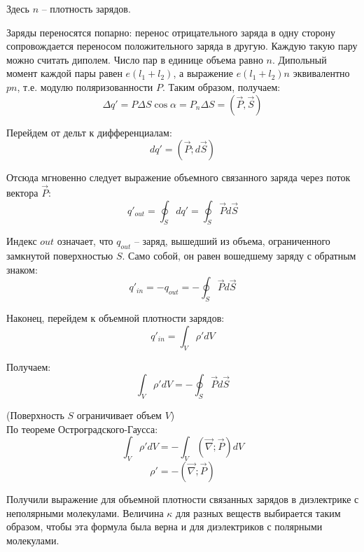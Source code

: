 \documentclass{article}
\begin{document}
	Здесь $n$ -- плотность зарядов.

	Заряды переносятся попарно: перенос отрицательного заряда в одну сторону сопровождается переносом положительного заряда в другую. Каждую такую пару можно считать диполем. Число пар в единице объема равно $n$. Дипольный момент каждой пары равен $e(l_1+l_2)$, а выражение $e(l_1+l_2)n$ эквивалентно $pn$, т.е. модулю поляризованности $P$. Таким образом, получаем:
	\begin{equation}
		\Delta q' = P\Delta S \cos\alpha = P_n\Delta S = (\vec P, \vec S)
	\end{equation}

	Перейдем от дельт к дифференциалам:
	\begin{equation}
		dq' = (\vec P;d\vec S)
	\end{equation}

	Отсюда мгновенно следует выражение объемного связанного заряда через поток вектора $\vec P$:
	\begin{equation}
		q'_{out} = \oint_S dq' = \oint_S \vec Pd\vec S
	\end{equation}

	Индекс $out$ означает, что $q_{out}$ -- заряд, вышедший из объема, ограниченного замкнутой поверхностью $S$. Само собой, он равен вошедшему заряду с обратным знаком:
	\begin{equation}
		q'_{in} = -q_{out} = -\oint_S \vec Pd\vec S
	\end{equation}

	Наконец, перейдем к объемной плотности зарядов:
	\begin{equation}
		q'_{in} = \int_V \rho' dV
	\end{equation}

	Получаем:
	\begin{equation}
		\int_V \rho'dV = -\oint_S \vec P d\vec S
	\end{equation}

	(Поверхность $S$ ограничивает объем $V$)\\

	По теореме Остроградского-Гаусса:
	\begin{equation}
		\int_V \rho'dV = -\int_V(\vec\nabla;\vec P)dV
	\end{equation}
	\begin{equation}
		\rho' = -(\vec\nabla;\vec P)
	\end{equation}

	Получили выражение для объемной плотности связанных зарядов в диэлектрике с неполярными молекулами. Величина $\kappa$ для разных веществ выбирается таким образом, чтобы эта формула была верна и для диэлектриков с полярными молекулами.
\end{document}

